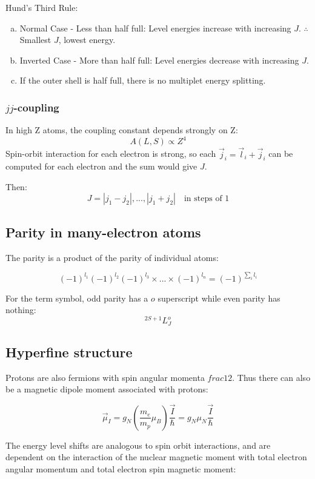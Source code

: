 \documentclass[12pt]{article}
\begin{document}
Hund's Third Rule:
\begin{enumerate}[(a)]
    \item Normal Case - Less than half full: Level energies increase with increasing $J$. $\therefore$ Smallest $J$, lowest energy.
    \item Inverted Case - More than half full: Level energies decrease with increasing $J$.
    \item If the outer shell is half full, there is no multiplet energy splitting.
\end{enumerate}


\subsubsection{$jj$-coupling}

In high Z atoms, the coupling constant depends strongly on Z:
\[A(L,S) \propto Z^4\]
Spin-orbit interaction for each electron is strong, so each $\vec{j}_i = \vec{l}_i +\vec{j}_i$ can be computed for each electron and the sum would give $J$.

Then:
\[J = |j_1-j_2|,...,|j_1+j_2| \quad \text{in steps of 1}\] 

\subsection{Parity in many-electron atoms}

The parity is a product of the parity of individual atoms:

\[(-1)^{l_1}(-1)^{l_2}(-1)^{l_3}\times...\times(-1)^{l_n} = (-1)^{\sum_i l_i}\]

For the term symbol, odd parity has a $o$ superscript while even parity has nothing:
\[ ^{2S+1}L_J^o\]

\subsection{Hyperfine structure}

Protons are also fermions with spin angular momenta $frac12$. Thus there can also be a magnetic dipole moment associated with protons:

\[\vec{\mu}_I = g_N \left(\frac{m_e}{m_p}\mu_B\right)\frac{\vec{I}}{\hbar} = g_N \mu_N \frac{\vec{I}}{\hbar}\]

The energy level shifts are analogous to spin orbit interactions, and are dependent on the interaction of the nuclear magnetic moment with total electron angular momentum and total electron spin magnetic moment:
\end{document}
